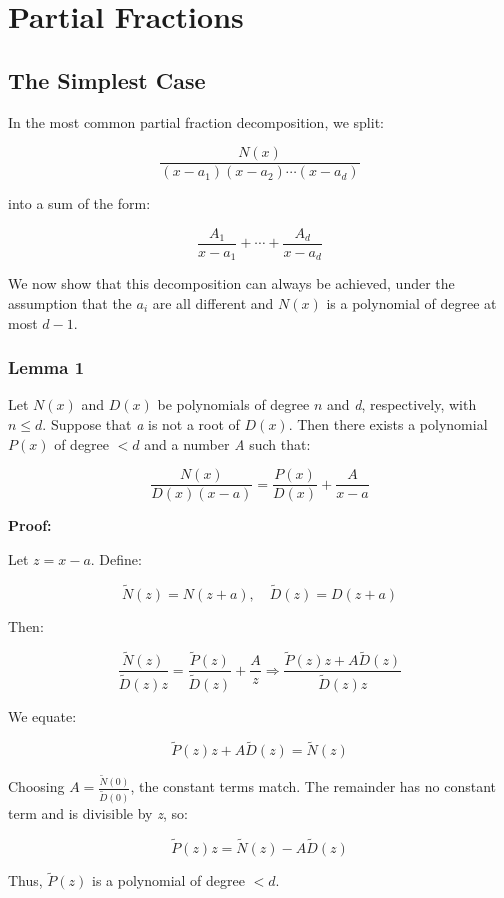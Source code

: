\newpage
\section{Partial Fractions}

\subsection{The Simplest Case}

In the most common partial fraction decomposition, we split:

\[
    \frac{N(x)}{(x - a_1)(x - a_2)\cdots(x - a_d)}
\]

into a sum of the form:

\[
    \frac{A_1}{x - a_1} + \cdots + \frac{A_d}{x - a_d}
\]

We now show that this decomposition can always be achieved, under the assumption that the \(a_i\) are 
all different and \(N(x)\) is a polynomial of degree at most \(d - 1\).

\subsubsection{Lemma 1}

Let \(N(x)\) and \(D(x)\) be polynomials of degree \(n\) and \emph{d}, respectively, with \(n \leq d\). 
Suppose that \emph{a} is not a root of \(D(x)\). Then there exists a polynomial \(P(x)\) of degree \(< d\) 
and a number \emph{A} such that:

\[
    \frac{N(x)}{D(x)(x - a)} = \frac{P(x)}{D(x)} + \frac{A}{x - a}
\]

\textbf{Proof:} 

Let \(z = x - a\). Define:

\[
    \tilde{N}(z) = N(z + a), \quad \tilde{D}(z) = D(z + a)
\]

Then:

\[
    \frac{\tilde{N}(z)}{\tilde{D}(z)z} = \frac{\tilde{P}(z)}{\tilde{D}(z)} + \frac{A}{z}
    \Rightarrow \frac{\tilde{P}(z)z + A\tilde{D}(z)}{\tilde{D}(z)z}
\]

We equate:

\[
    \tilde{P}(z)z + A\tilde{D}(z) = \tilde{N}(z)
\]

Choosing \(A = \frac{\tilde{N}(0)}{\tilde{D}(0)}\), the constant terms match. The remainder has no 
constant term and is divisible by \emph{z}, so:

\[
    \tilde{P}(z)z = \tilde{N}(z) - A\tilde{D}(z)
\]

Thus, \(\tilde{P}(z)\) is a polynomial of degree \(< d\).


